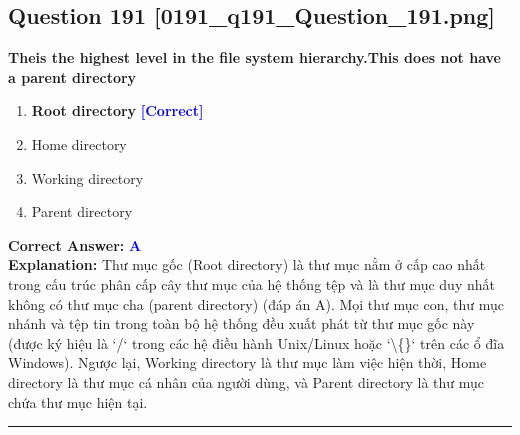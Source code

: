 \documentclass[11pt,a4paper]{article}
\begin{document}
\begin{minipage}{\textwidth}
\subsection*{Question 191 \quad \footnotesize{[0191\_q191\_Question\_191.png]}}
\noindent \textbf{Theis the highest level in the file system hierarchy.This does not have a parent directory}

\begin{enumerate}[label=\Alph*.]
    \item \textbf{Root directory} \hfill \textcolor{blue}{\textbf{[Correct]}}
    \item Home directory
    \item Working directory
    \item Parent directory
\end{enumerate}

\noindent \textbf{Correct Answer:} \textcolor{blue}{\textbf{A}} \\[2pt]
\noindent \textbf{Explanation:} Thư mục gốc (Root directory) là thư mục nằm ở cấp cao nhất trong cấu trúc phân cấp cây thư mục của hệ thống tệp và là thư mục duy nhất không có thư mục cha (parent directory) (đáp án A). Mọi thư mục con, thư mục nhánh và tệp tin trong toàn bộ hệ thống đều xuất phát từ thư mục gốc này (được ký hiệu là `/` trong các hệ điều hành Unix/Linux hoặc `\textbackslash\{\}` trên các ổ đĩa Windows). Ngược lại, Working directory là thư mục làm việc hiện thời, Home directory là thư mục cá nhân của người dùng, và Parent directory là thư mục chứa thư mục hiện tại.

\par\vspace{0.3cm}
\hrule
\vspace{0.3cm}
\end{minipage}
\end{document}
